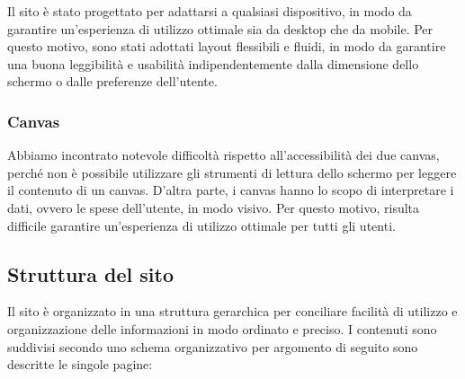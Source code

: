 Il sito è stato progettato per adattarsi a qualsiasi dispositivo, in modo da
garantire un'esperienza di utilizzo ottimale sia da desktop che da mobile. Per
questo motivo, sono stati adottati layout flessibili e fluidi, in modo da
garantire una buona leggibilità e usabilità indipendentemente dalla dimensione
dello schermo o dalle preferenze dell'utente.

\subsubsection{Canvas}

Abbiamo incontrato notevole difficoltà rispetto all'accessibilità dei due
canvas, perché non è possibile utilizzare gli strumenti di lettura dello
schermo per leggere il contenuto di un canvas. D'altra parte, i canvas hanno lo
scopo di interpretare i dati, ovvero le spese dell'utente, in modo visivo. Per
questo motivo, risulta difficile garantire un'esperienza di utilizzo ottimale
per tutti gli utenti.

\subsection{Struttura del sito}

Il sito è organizzato in una struttura gerarchica per conciliare facilità di utilizzo e organizzazione delle informazioni in modo ordinato e preciso. I contenuti sono suddivisi secondo uno schema organizzativo per argomento di seguito sono descritte le singole pagine:

